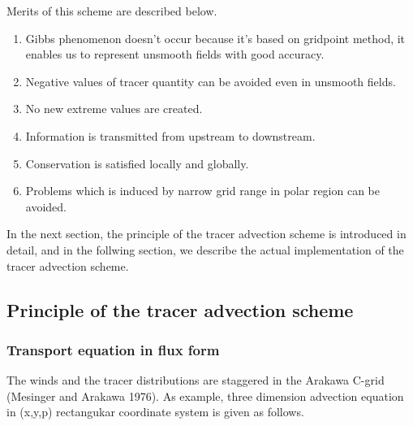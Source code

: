 Merits of this scheme are described below.
\begin{enumerate}
\item Gibbs phenomenon doesn't occur because it's based on gridpoint method, it enables us to represent unsmooth fields with good accuracy. 
\item Negative values of tracer quantity can be avoided even in unsmooth fields.
\item No new extreme values are created.
\item Information is transmitted from upstream to downstream.
\item Conservation is satisfied locally and globally.
\item Problems which is induced by narrow grid range in polar region can be avoided.
\end{enumerate}
In the next section, the principle of the tracer advection scheme is introduced in detail, and in the follwing section, we describe the actual implementation of the tracer advection scheme.

\subsection{Principle of the tracer advection scheme}
\subsubsection{Transport equation in flux form}
The winds and the tracer distributions are staggered in the Arakawa C-grid (Mesinger and Arakawa 1976).
As example, three dimension advection equation in (x,y,p) rectangukar coordinate system is given as follows. 

